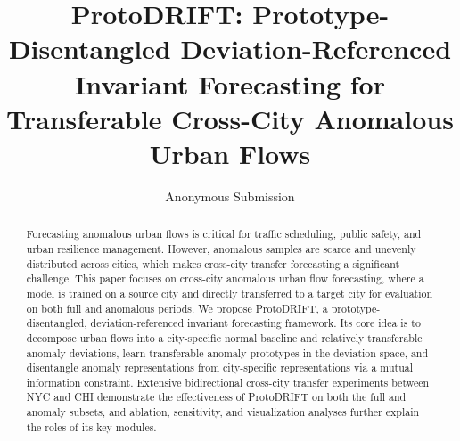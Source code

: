 \documentclass[letterpaper]{article} %
\title{ProtoDRIFT: Prototype-Disentangled Deviation-Referenced Invariant Forecasting for Transferable Cross-City Anomalous Urban Flows}
\author{Anonymous Submission}
\begin{document}
\maketitle

\begin{abstract}

Forecasting anomalous urban flows is critical for traffic scheduling, public safety, and urban resilience management. However, anomalous samples are scarce and unevenly distributed across cities, which makes cross-city transfer forecasting a significant challenge. This paper focuses on cross-city anomalous urban flow forecasting, where a model is trained on a source city and directly transferred to a target city for evaluation on both full and anomalous periods. We propose ProtoDRIFT, a prototype-disentangled, deviation-referenced invariant forecasting framework. Its core idea is to decompose urban flows into a city-specific normal baseline and relatively transferable anomaly deviations, learn transferable anomaly prototypes in the deviation space, and disentangle anomaly representations from city-specific representations via a mutual information constraint. Extensive bidirectional cross-city transfer experiments between NYC and CHI demonstrate the effectiveness of ProtoDRIFT on both the full and anomaly subsets, and ablation, sensitivity, and visualization analyses further explain the roles of its key modules.

\end{abstract}










%

% 
\end{document}
